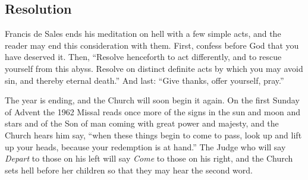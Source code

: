 \subsection{Resolution}

Francis de Sales ends his meditation on hell with a few simple acts, and the reader may end this consideration with them. First, confess before God that you have deserved it. Then, ``Resolve henceforth to act differently, and to rescue yourself from this abyss. Resolve on distinct definite acts by which you may avoid sin, and thereby eternal death.'' And last: ``Give thanks, offer yourself, pray.''

The year is ending, and the Church will soon begin it again. On the first Sunday of Advent the 1962 Missal reads once more of the signs in the sun and moon and stars and of the Son of man coming with great power and majesty, and the Church hears him say, ``when these things begin to come to pass, look up and lift up your heads, because your redemption is at hand.'' The Judge who will say \emph{Depart} to those on his left will say \emph{Come} to those on his right, and the Church sets hell before her children so that they may hear the second word.
